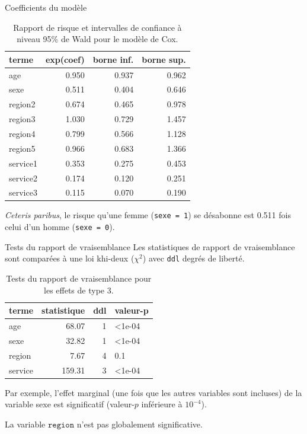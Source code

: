 \documentclass[
  ignorenonframetext,
]{beamer}
\begin{document}
\begin{frame}[fragile]{Coefficients du modèle}
\protect{}\label{coefficients-du-moduxe8le}
\begin{longtable}[t]{lrrr}

\caption{\label{tbl-survie5-coefs}Rapport de risque et intervalles de
confiance à niveau 95\% de Wald pour le modèle de Cox.}

\tabularnewline

\toprule
terme & exp(coef) & borne inf. & borne sup.\\
\midrule
age & 0.950 & 0.937 & 0.962\\
sexe & 0.511 & 0.404 & 0.646\\
region2 & 0.674 & 0.465 & 0.978\\
region3 & 1.030 & 0.729 & 1.457\\
region4 & 0.799 & 0.566 & 1.128\\
\addlinespace
region5 & 0.966 & 0.683 & 1.366\\
service1 & 0.353 & 0.275 & 0.453\\
service2 & 0.174 & 0.120 & 0.251\\
service3 & 0.115 & 0.070 & 0.190\\
\bottomrule

\end{longtable}

\emph{Ceteris paribus}, le risque qu'une femme (\texttt{sexe\ =\ 1}) se
désabonne est 0.511 fois celui d'un homme (\texttt{sexe\ =\ 0}).
\end{frame}

\begin{frame}[fragile]{Tests du rapport de vraisemblance}
\protect{}\label{tests-du-rapport-de-vraisemblance}
Les statistiques de rapport de vraisemblance sont comparées à une loi
khi-deux (\(\chi^2\)) avec \texttt{ddl} degrés de liberté.

\begin{longtable}[t]{lrrl}

\caption{\label{tbl-survie5-deviance}Tests du rapport de vraisemblance
pour les effets de type 3.}

\tabularnewline

\toprule
terme & statistique & ddl & valeur-p\\
\midrule
age & 68.07 & 1 & <1e-04\\
sexe & 32.82 & 1 & <1e-04\\
region & 7.67 & 4 & 0.1\\
service & 159.31 & 3 & <1e-04\\
\bottomrule

\end{longtable}

Par exemple, l'effet marginal (une fois que les autres variables sont
incluses) de la variable sexe est significatif (valeur-\(p\) inférieure
à \(10^{-4}\)).

La variable \(\texttt{region}\) n'est pas globalement significative.
\end{frame}
\end{document}
